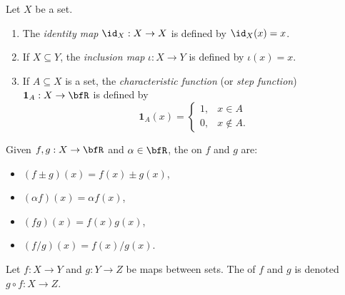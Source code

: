     \begin{example}\label{example:examples-of-functions}
        Let $X$ be a set.
        \begin{enumerate}[label = (\arabic*)]
            \item The \textit{identity map} $\id_X:X \rightarrow X$ is defined by $\id_X(x) = x$.
            \item If $X \subseteq Y$, the \textit{inclusion map} $\iota: X \rightarrow Y$ is defined by $\iota(x) = x$.
            \item If $A \subseteq X$ is a set, the \textit{characteristic function} (or \textit{step function}) $\mathbf{1}_A : X \rightarrow \bfR$  is defined by
                \begin{equation*}
                    \mathbf{1}_A(x) = 
                \begin{cases}
                    1, & x \in A \\
                    0, & x \not\in A.
                \end{cases}
                \end{equation*}
        \end{enumerate}
    \end{example}

    \begin{definition}
        Given $f,g : X \rightarrow \bfR$ and $\alpha \in \bfR$, the  on $f$ and $g$ are:
            \begin{itemize}
                \item $(f\pm g)(x) = f(x) \pm g(x)$,
                \item $(\alpha f)(x) = \alpha f(x)$,
                \item $(fg)(x) = f(x)g(x)$,
                \item $(f/g)(x) = f(x)/g(x)$.
            \end{itemize}
    \end{definition}

    \begin{definition}
        Let $f:X \rightarrow Y$ and $g: Y \rightarrow Z$ be maps between sets. The  of $f$ and $g$ is denoted $g \circ f :X \rightarrow Z$.
            \begin{center}
            \end{center}
    \end{definition}

